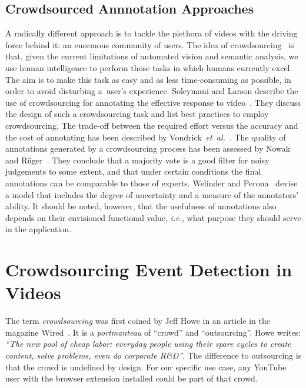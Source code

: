\documentclass[runningheads,a4paper]{llncs}
\begin{document}
\subsection{Crowdsourced Annnotation Approaches} 
A radically different approach is to tackle the plethora of videos with the driving force behind it: an enormous community of users. The idea of crowdsourcing~\cite{Doan:2011} is that, given the current limitations of automated vision and semantic analysis, we use human intelligence to perform those tasks in which humans currently excel. The aim is to make this task as easy and as less time-consuming as possible, in order to avoid disturbing a~user's experience. Soleymani and Larson describe the use of crowdsourcing for annotating the effective response to video~\cite{Soleymani:2010}. They discuss the design of such a crowdsourcing task and list best practices to employ crowdsourcing. The trade-off between the required effort versus the accuracy and the cost of annotating has been described by Vondrick~\emph{et~al.}~\cite{Vondrick:2010}. The quality of annotations generated by a crowdsourcing process has been assessed by Nowak and R\"{u}ger~\cite{Nowak:2010}. They conclude that a majority vote is a good filter for noisy judgements to some extent, and that under certain conditions the final annotations can be comparable to those of experts. Welinder and Perona~\cite{Welinder:2010} devise a model that includes the degree of uncertainty and a measure of the annotators' ability. It should be noted, however, that the usefulness of annotations also depends on their envisioned functional value, \emph{i.e.}, what purpose they should serve in the application.

\section{Crowdsourcing Event Detection in Videos} \label{sec:crowdsourcing}
The term \emph{crowdsourcing} was first coined by Jeff Howe in an article in the magazine Wired~\cite{crowdsourcing}. It is a \textit{portmanteau} of ``crowd'' and ``outsourcing''. Howe writes: \textit{``The new pool of cheap labor: everyday people using their spare cycles to create content, solve problems, even do corporate R\&D''}. The difference to outsourcing is that the crowd is undefined by design. For our specific use case, any YouTube user with the browser extension installed could be part of that crowd. 
\end{document}
